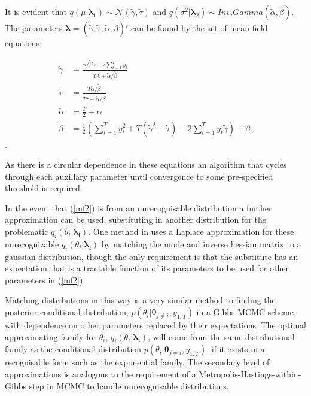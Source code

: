 \documentclass[12pt,a4paper]{article}%
\numberwithin{equation}{section}
\begin{document}
It is evident that $q(\mu | \boldsymbol{\lambda}_1) \sim \mathcal{N}(\tilde{\gamma}, \tilde{\tau})$ and $q(\sigma^2 | \boldsymbol{\lambda}_2) \sim Inv.Gamma(\tilde{\alpha}, \tilde{\beta})$. The parameters $\boldsymbol{\lambda} = (\tilde{\gamma}, \tilde{\tau}, \tilde{\alpha}, \tilde{\beta})'$ can be found by the set of mean field equations:

\begin{align}
\tilde{\gamma} &= \frac{\tilde{\alpha} / \tilde{\beta} \gamma + \tau \sum_{t=1}^{T} y_t} {T \lambda + \tilde{\alpha} / \tilde{\beta}} \label{mf5} \\ 
\tilde{\tau} &= \frac{T \tilde{\alpha} / \tilde{\beta}}{T \tau + \tilde{\alpha} / \tilde{\beta}} \label{mf6} \\
\tilde{\alpha} &= \frac{T}{2} + \alpha  \label{mf7} \\
\tilde{\beta} &= \frac{1}{2} \left(\sum_{t=1}^{T} y_t^2 + T(\tilde{\gamma}^2 + \tilde{\tau}) - 2 \sum_{t=1}^{T} y_t \tilde{\gamma} \right) + \beta. \label{mf8}
\end{align}.

As there is a circular dependence in these equations an algorithm that cycles through each auxillary parameter until convergence to some pre-specified threshold is required.

In the event that (\ref{mf2}) is from an unrecognisable distribution a further approximation can be used, substituting in another distribution for the problematic $q_i(\theta_i |\boldsymbol{\lambda_i}).$ One method in \citet{Friston2006} uses a Laplace approximation for these unrecognizable $q_i(\theta_i |\boldsymbol{\lambda_i})$ by matching the mode and inverse hessian matrix to a gaussian distribution, though the only requirement is that the substitute has an expectation that is a tractable function of its parameters to be used for other parameters in (\ref{mf2}). 

Matching distributions in this way is a very similar method to finding the posterior conditional distribution, $p(\theta_i | \boldsymbol{\theta}_{j \neq i}, y_{1:T})$ in a Gibbs MCMC scheme, with dependence on other parameters replaced by their expectations. The optimal approximating family for $\theta_i$, $q_i(\theta_i |\boldsymbol{\lambda_i})$, will come from the same distributional family as the conditional distribution $p(\theta_i | \boldsymbol{\theta}_{j \neq i}, y_{1:T})$, if it exists in a recognisable form such as the exponential family. The secondary level of approximations is analogous to the requirement of a Metropolis-Hastings-within-Gibbs step in MCMC to handle unrecognisable distributions.
\vspace{5mm}
\end{document}
